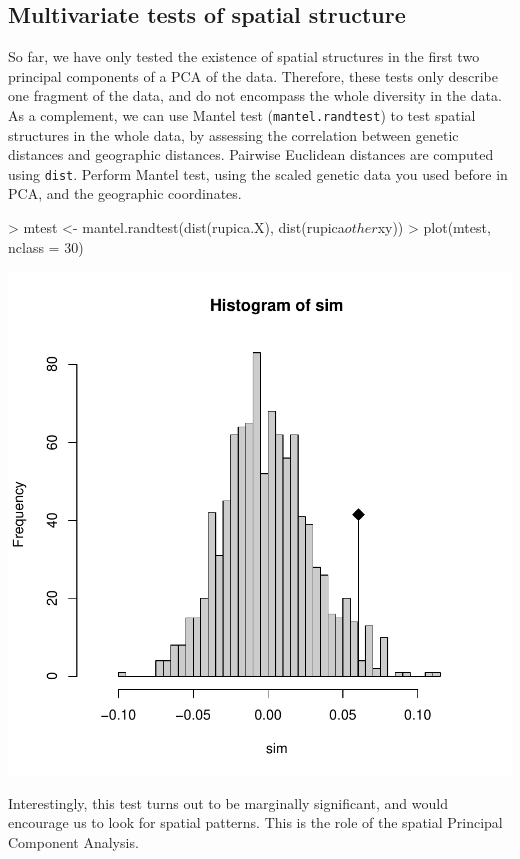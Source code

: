 \documentclass{article}
\begin{document}
\subsection{Multivariate tests of spatial structure}
So far, we have only tested the existence of spatial structures in the first two principal components
of a PCA of the data.
Therefore, these tests only describe one fragment of the data, and do not encompass the whole
diversity in the data.
As a complement, we can use Mantel test (\texttt{mantel.randtest}) to test spatial structures in the
whole data, by assessing the correlation between genetic distances and geographic distances.
Pairwise Euclidean distances are computed using \texttt{dist}.
Perform Mantel test, using the scaled genetic data you used before in PCA, and the geographic coordinates.
\begin{Schunk}
\begin{Sinput}
> mtest <- mantel.randtest(dist(rupica.X), dist(rupica$other$xy))
> plot(mtest, nclass = 30)
\end{Sinput}
\end{Schunk}
\includegraphics{figs/spca-046}

\noindent Interestingly, this test turns out to be marginally significant, and would encourage us to
look for spatial patterns. This is the role of the spatial Principal Component Analysis.
\end{document}
